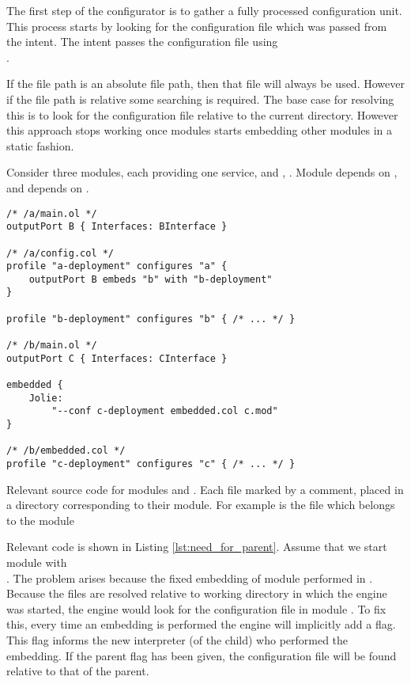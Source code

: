The first step of the configurator is to gather a fully processed configuration
unit. This process starts by looking for the configuration file which was
passed from the intent. The intent passes the configuration file using
\\.

If the file path is an absolute file path, then that file will always be used.
However if the file path is relative some searching is required. The base case
for resolving this is to look for the configuration file relative to the
current directory. However this approach stops working once modules starts
embedding other modules in a static fashion.

Consider three modules, each providing one service,  and ,
. Module  depends on , and  depends on
.

\begin{listing}[H]
\begin{verbatim}
/* /a/main.ol */
outputPort B { Interfaces: BInterface }

/* /a/config.col */
profile "a-deployment" configures "a" {
    outputPort B embeds "b" with "b-deployment"
}

profile "b-deployment" configures "b" { /* ... */ }

/* /b/main.ol */
outputPort C { Interfaces: CInterface }

embedded {
    Jolie:
        "--conf c-deployment embedded.col c.mod"
}

/* /b/embedded.col */
profile "c-deployment" configures "c" { /* ... */ }
\end{verbatim}

\caption{Relevant source code for modules  and . Each file
    marked by a comment, placed in a directory corresponding to their module.
        For example  is the  file which belongs
        to the module }

\label{lst:need_for_parent}

\end{listing}

Relevant code is shown in Listing \ref{lst:need_for_parent}.  Assume that we
start module  with \\.  The
problem arises because the fixed embedding of module  performed in
. Because the files are resolved relative to working directory in which
the engine was started, the engine would look for the configuration file in
module . To fix this, every time an embedding is performed the engine
will implicitly add a  flag. This flag informs the new
interpreter (of the child) who performed the embedding. If the parent flag has
been given, the configuration file will be found relative to that of the
parent.


